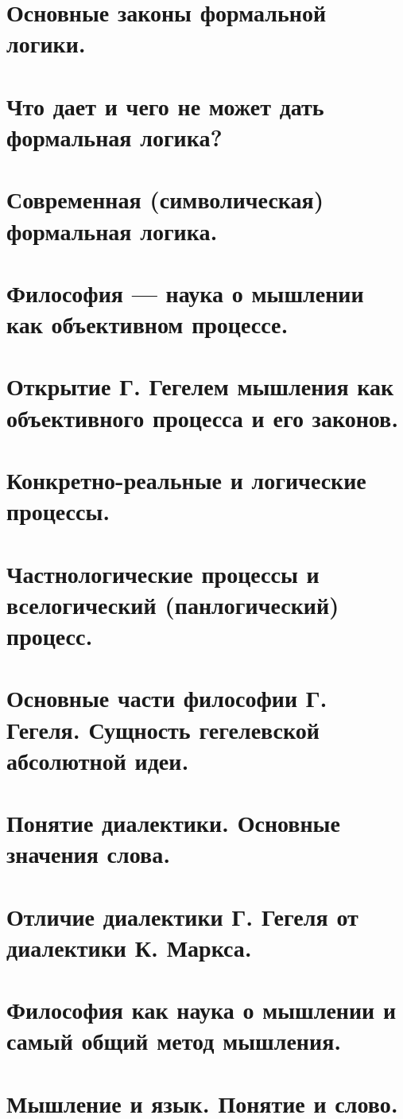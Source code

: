 \section{ Основные законы формальной логики.}
\section{ Что дает и чего не может дать формальная логика?}
\section{ Современная (символическая) формальная логика.}
\section{ Философия — наука о мышлении как объективном процессе.}
\section{ Открытие Г. Гегелем мышления как объективного процесса и его законов.}
\section{ Конкретно-реальные и логические процессы.}
\section{ Частнологические процессы и вселогический (панлогический) процесс.}
\section{ Основные части философии Г. Гегеля. Сущность гегелевской абсолютной идеи.}
\section{ Понятие диалектики. Основные значения слова.}
\section{ Отличие диалектики Г. Гегеля от диалектики К. Маркса.}
\section{ Философия как наука о мышлении и самый общий метод мышления.}
\section{ Мышление и язык. Понятие и слово.}
